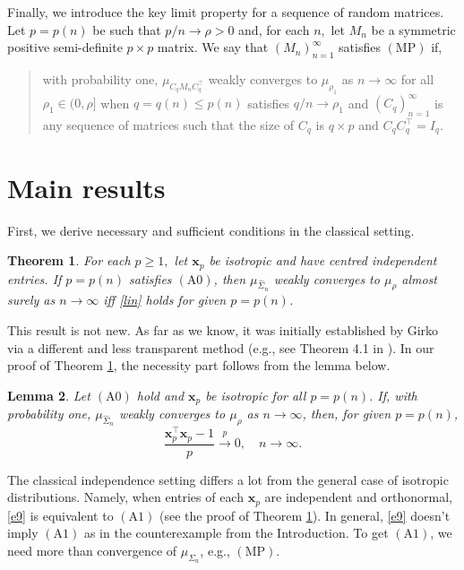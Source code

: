 \documentclass[12pt, a4paper]{article}
\newcommand\x{\mathbf x}
\newcommand\wh{\widehat }
\newcommand\pto{\stackrel p\rightarrow}
\newtheorem{theorem}{Theorem}[section]%
\newtheorem{lemma}[theorem]{Lemma}%
\begin{document}
Finally, we introduce the key limit  property for a sequence of random matrices. Let $p=p(n)$ be such that $p/n\to\rho>0 $   and, for each $n,$ let $M_n$ be a symmetric positive semi-definite $p\times p$  matrix. We say that $(M_n)_{n=1}^\infty$  satisfies $(\mathrm {MP})$ if,
\begin{quote} with probability one,  $\mu_{C_qM_nC_q^\top }$ weakly converges to $\mu_{\rho_1}$
as $n\to\infty$ for all $\rho_1\in(0,\rho]$ when $q=q(n)\leqslant p(n)$ satisfies $q/n\to \rho_1$ and $(C_q)_{n=1}^\infty$ is any sequence of matrices such that the size of $C_q$ is $q\times p$ and $C_q C_q^\top=I_q$.
\end{quote}


\section{Main results}

First, we derive necessary and sufficient conditions in the classical setting. 

\begin{theorem}\label{t3}  For each $p\geqslant 1,$ let  $\x_p$ be  isotropic and have centred independent entries. If $p=p(n)$ satisfies $(\mathrm A0)$,  then  $ \mu_{\wh\Sigma_n} $ weakly converges to $\mu_\rho$ almost surely as $n\to\infty$ iff \eqref{lin} holds for given $p=p(n)$. 
\end{theorem}

This result is not new. As far as we know, it was initially established by Girko via a different and less transparent method (e.g., see Theorem 4.1 in \cite{G1}). In our proof of Theorem \ref{t3}, the necessity part  follows from the lemma below. 


\begin{lemma}\label{ml1}
Let $(\mathrm A0)$ hold and $\x_p$ be isotropic for all $p=p(n)$. If, with probability one, $\mu_{\wh \Sigma_n}$ weakly converges to $\mu_\rho$ as $n\to\infty$, then, for given $p=p(n)$, 
\begin{equation}\label{e9}
  \frac{ \x_p^\top \x_p-1}{p}\pto 0,\quad n\to\infty.
\end{equation}
\end{lemma}
  
The classical independence setting differs a lot from the general case of isotropic distributions. Namely, when entries of each $\x_p$ are independent and orthonormal,  \eqref{e9} is equivalent to $(\mathrm A1)$ (see the proof of Theorem \ref{t3}). In general,   \eqref{e9}  doesn't imply   $(\mathrm A1)$ as in the counterexample from the Introduction. To get   $(\mathrm A1)$, we need more  than convergence of $\mu_{\wh\Sigma_n}$, e.g., $(\mathrm{MP})$.
\end{document}
